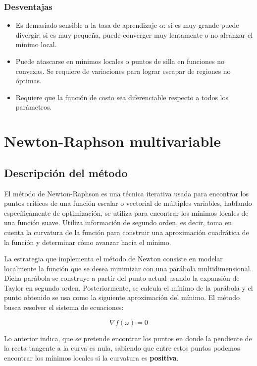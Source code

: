 \documentclass[conference]{IEEEtran}
\begin{document}
\subsubsection{Desventajas}
\begin{itemize}
    \item Es demasiado sensible a la tasa de aprendizaje $\alpha$: si es muy grande puede divergir; si es muy pequeña, puede converger muy lentamente o no alcanzar el mínimo local.
    \item Puede atascarse en mínimos locales o puntos de silla en funciones no convexas. Se requiere de variaciones para lograr escapar de regiones no óptimas.
    \item Requiere que la función de costo sea diferenciable respecto a todos los parámetros.
\end{itemize}

\section{Newton-Raphson multivariable}

\subsection{Descripción del método}
El método de Newton-Raphson es una técnica iterativa usada para encontrar los puntos críticos de una función escalar o vectorial de múltiples variables, hablando específicamente de optimización, se utiliza para encontrar los mínimos locales de una función suave. Utiliza información de segundo orden, es decir, toma en cuenta la curvatura de la función para construir una aproximación cuadrática de la función y determinar cómo avanzar hacia el mínimo.

La estrategia que implementa el método de Newton consiste en modelar localmente la función que se desea minimizar con una parábola multidimensional. Dicha parábola se construye a partir del punto actual usando la expansión de Taylor en segundo orden. Posteriormente, se calcula el mínimo de la parábola y el punto obtenido se usa como la siguiente aproximación del mínimo.
El método busca resolver el sistema de ecuaciones:

$$\nabla f(\omega)=0$$

Lo anterior indica, que se pretende encontrar los puntos en donde la pendiente de la recta tangente a la curva es nula, sabiendo que entre estos puntos podemos encontrar los mínimos locales si la curvatura es \textbf{positiva}.
\end{document}
